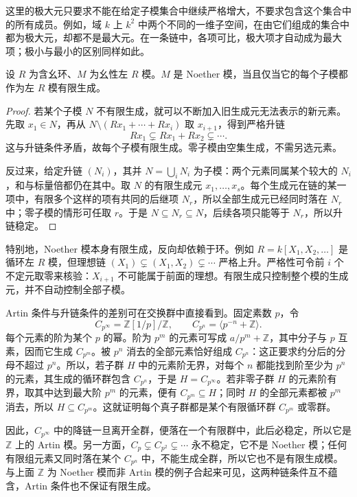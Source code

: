 这里的极大元只要求不能在给定子模集合中继续严格增大，不要求包含这个集合中的所有成员。例如，域 \(k\) 上 \(k^2\) 中两个不同的一维子空间，在由它们组成的集合中都为极大元，却都不是最大元。在一条链中，各项可比，极大项才自动成为最大项；极小与最小的区别同样如此。

\begin{proposition}\label{b2:prop:noetherian-submodules-fg}
	设 \(R\) 为含幺环、\(M\) 为幺性左 \(R\) 模。\(M\) 是 Noether 模，当且仅当它的每个子模都作为左 \(R\) 模有限生成。
\end{proposition}
\begin{proof}
	若某个子模 \(N\) 不有限生成，就可以不断加入旧生成元无法表示的新元素。先取 \(x_1\in N\)，再从 \(N\setminus(Rx_1+\cdots+Rx_i)\) 取 \(x_{i+1}\)，得到严格升链
	\[
		Rx_1\subsetneq Rx_1+Rx_2\subsetneq\cdots.
	\]
	这与升链条件矛盾，故每个子模有限生成。零子模由空集生成，不需另选元素。

	反过来，给定升链 \((N_i)\)，其并 \(N=\bigcup_iN_i\) 为子模：两个元素同属某个较大的 \(N_i\)，和与标量倍都仍在其中。取 \(N\) 的有限生成元 \(x_1,\ldots,x_s\)。每个生成元在链的某一项中，有限多个这样的项有共同的后继项 \(N_r\)，所以全部生成元已经同时落在 \(N_r\) 中；零子模的情形可任取 \(r\)。于是 \(N\subseteq N_r\subseteq N\)，后续各项只能等于 \(N_r\)，所以升链稳定。
\end{proof}

特别地，Noether 模本身有限生成，反向却依赖于环。例如 \(R=k[X_1,X_2,\ldots]\) 是循环左 \(R\) 模，但理想链 \((X_1)\subsetneq(X_1,X_2)\subsetneq\cdots\) 严格上升。严格性可令前 \(i\) 个不定元取零来核验：\(X_{i+1}\) 不可能属于前面的理想。有限生成只控制整个模的生成元，并不自动控制全部子模。

\ProseParagraphBreak
Artin 条件与升链条件的差别可在交换群中直接看到。固定素数 \(p\)，令
\[
	C_{p^\infty}=\mathbb Z[1/p]/\mathbb Z,\qquad C_{p^n}=\langle p^{-n}+\mathbb Z\rangle.
\]
每个元素的阶为某个 \(p\) 的幂。阶为 \(p^m\) 的元素可写成 \(a/p^m+\mathbb Z\)，其中分子与 \(p\) 互素，因而它生成 \(C_{p^m}\)。被 \(p^n\) 消去的全部元素恰好组成 \(C_{p^n}\)：这正要求约分后的分母不超过 \(p^n\)。所以，若子群 \(H\) 中的元素阶无界，对每个 \(n\) 都能找到阶至少为 \(p^n\) 的元素，其生成的循环群包含 \(C_{p^n}\)，于是 \(H=C_{p^\infty}\)。若非零子群 \(H\) 的元素阶有界，取其中达到最大阶 \(p^m\) 的元素，便有 \(C_{p^m}\subseteq H\)；同时 \(H\) 的全部元素都被 \(p^m\) 消去，所以 \(H\subseteq C_{p^m}\)。这就证明每个真子群都是某个有限循环群 \(C_{p^m}\) 或零群。

\ProseParagraphBreak
因此，\(C_{p^\infty}\) 中的降链一旦离开全群，便落在一个有限群中，此后必稳定，所以它是 \(\mathbb Z\) 上的 Artin 模。另一方面，\(C_p\subsetneq C_{p^2}\subsetneq\cdots\) 永不稳定，它不是 Noether 模；任何有限组元素又同时落在某个 \(C_{p^n}\) 中，不能生成全群，所以它也不是有限生成模。与上面 \(\mathbb Z\) 为 Noether 模而非 Artin 模的例子合起来可见，这两种链条件互不蕴含，Artin 条件也不保证有限生成。

